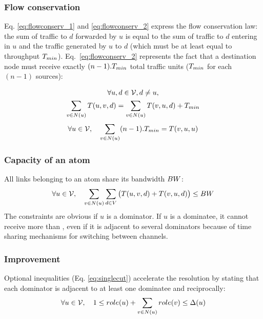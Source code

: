 \documentclass[twoside]{article}
\begin{document}
\subsubsection{Flow conservation}
Eq. \ref{eq:flowconserv_1} and \ref{eq:flowconserv_2} express the flow
conservation law: the sum of traffic to $d$ forwarded by $u$ is equal to
the sum of traffic to $d$ entering in $u$ and the traffic generated by
$u$ to $d$ (which must be at least equal to throughput
$T_{min}$). Eq.~\ref{eq:flowconserv_2} represents the fact that a
destination node must receive exactly $(n-1).T_{min}$ total
traffic units ($T_{min}$ for each $(n-1)$ sources):

\begin{multline}
	\forall u,d\in \mathcal{V}, d \neq u, \\  \sum_{v\in N(u)} T(u,v,d) =   \sum_{v\in N(u)} T(v,u,d)  +  T_{min}\label{eq:flowconserv_1} 
\end{multline}
\begin{equation}
	\forall u\in \mathcal{V},\quad 	\sum_{v\in N(u)}  (n-1).T_{min} = T(v,u,u) \label{eq:flowconserv_2}
\end{equation}


\subsubsection{Capacity of an atom}
All links belonging to an atom share its bandwidth $BW$:
\begin{equation}
\forall u\in \mathcal{V},	\quad	\sum_{v\in N(u)}\sum_{d\in V}\big(T(u,v,d)+T(v,u,d)\big)   \leq  BW \label{eq:atomcapa} 
\end{equation}
The constraints are obvious if $u$ is a dominator. If $u$ is a
dominatee, it cannot receive more than \capa, even if it is adjacent
to several dominators because of time sharing mechanisms for switching
between channels.

\subsubsection{Improvement}
Optional inequalities (Eq. \ref{eq:singlecut}) accelerate the \milp
resolution by stating that each dominator is adjacent to at least one
dominatee and reciprocally:
\begin{equation}
\forall u\in \mathcal{V}, 	\quad	1 \leq  role(u) + \sum_{v\in
  N(u)}role(v) \leq \Delta(u) \label{eq:singlecut}
\end{equation}
\end{document}
